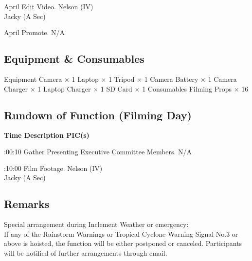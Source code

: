 \bTR{}
\eTD{} April
\eTD\bTD Edit Video.
\eTD\bTD Nelson (IV) \\ Jacky (A Sec)
\eTD\eTR

\bTR{}
\eTD{} April
\eTD\bTD Promote.
\eTD\bTD N/A
\eTD\eTR

\eTABLEbody
\eTABLE

\pagebreak
\subsection{Equipment \& Consumables}
\starttabulate[|l|l|]
\NC{}Equipment\NC\NR
\HL
\NC Camera          \NC $\times$ 1  \NR
\NC Laptop          \NC $\times$ 1  \NR
\NC Tripod          \NC $\times$ 1  \NR
\NC Camera Battery  \NC $\times$ 1  \NR
\NC Camera Charger  \NC $\times$ 1  \NR
\NC Laptop Charger  \NC $\times$ 1  \NR
\NC SD Card         \NC $\times$ 1  \NR
\HL
\NR
\NC{}Consumables\NC\NR
\HL
\NC Filming Props   \NC $\times$ 16 \NR
\HL
\stoptabulate

\subsection{Rundown of Function (Filming Day)}

\setupTABLE[c][1][width=1.25in]
\setupTABLE[c][2][width=3.5in]
\setupTABLE[c][3][width=1.25in]
\bTABLE
\bTABLEhead

\bTR\bTH    \bf{Time}
\eTH\bTH    \bf{Description}
\eTH\bTH    \bf{PIC(s)}
\eTH\eTR

\eTABLEhead
\bTABLEbody

\bTR{}:00:10
\eTD\bTD Gather Presenting Executive Committee Members.
\eTD\bTD N/A
\eTD\eTR

\bTR{}:10:00
\eTD\bTD Film Footage.
\eTD\bTD Nelson (IV) \\ Jacky (A Sec)
\eTD\eTR

\eTABLEbody
\eTABLE

\subsection{Remarks}
\startitemize
\item Special arrangement during Inclement Weather or emergency: \\
If any of the Rainstorm Warnings or Tropical Cyclone Warning Signal No.3 or above is hoisted, the function will be either postponed or canceled. Participants will be notified of further arrangements through email.
\stopitemize

\pagebreak
